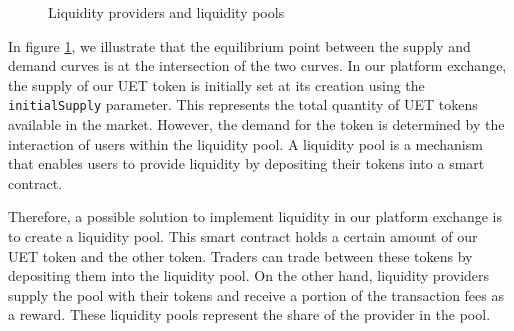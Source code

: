 \begin{figure}[ht]
    \centering

    \caption{Liquidity providers and liquidity pools}
    \label{fig:liquidity}
\end{figure}

In figure \ref{fig:liquidity}, we illustrate that the equilibrium point between the supply and demand curves
is at the intersection of the two curves. In our platform exchange, the supply of our UET token is initially set
at its creation using the \texttt{initialSupply} parameter. This represents the total quantity of UET tokens available in the market.
However, the demand for the token is determined by the interaction of users within the liquidity pool. A liquidity pool is a
mechanism that enables users to provide liquidity by depositing their tokens into a smart contract.


Therefore, a possible solution to implement liquidity in our platform exchange is to create a liquidity pool. This smart contract holds a certain amount of our UET token and the other token. Traders can trade between these tokens
by depositing them into the liquidity pool. On the other hand, liquidity providers supply the pool with their tokens
and receive a portion of the transaction fees as a reward. These liquidity pools represent the share of the provider in
the pool.


